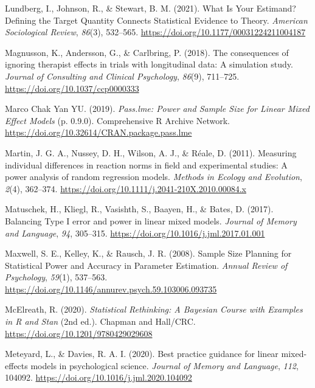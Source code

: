 \documentclass[
  man,
  floatsintext,
  longtable,
  a4paper,
  nolmodern,
  notxfonts,
  notimes,
  colorlinks=true,linkcolor=blue,citecolor=blue,urlcolor=blue]{apa7}
\newlength{\cslhangindent}
\newenvironment{CSLReferences}[2] %
 {\begin{list}{}{%
  \setlength{\itemindent}{0pt}
  \setlength{\leftmargin}{0pt}
  \setlength{\parsep}{0pt}
  \ifodd #1
   \setlength{\leftmargin}{\cslhangindent}
   \setlength{\itemindent}{-1\cslhangindent}
  \fi
  \setlength{\itemsep}{#2\baselineskip}}}
 {\end{list}}
\begin{document}
\begin{CSLReferences}{1}{0}
Lundberg, I., Johnson, R., \& Stewart, B. M. (2021). What {Is Your
Estimand}? {Defining} the {Target Quantity Connects Statistical
Evidence} to {Theory}. \emph{American Sociological Review},
\emph{86}(3), 532--565. \url{https://doi.org/10.1177/00031224211004187}

Magnusson, K., Andersson, G., \& Carlbring, P. (2018). The consequences
of ignoring therapist effects in trials with longitudinal data: {A}
simulation study. \emph{Journal of Consulting and Clinical Psychology},
\emph{86}(9), 711--725. \url{https://doi.org/10.1037/ccp0000333}

Marco Chak Yan YU. (2019). \emph{Pass.lme: {Power} and {Sample Size} for
{Linear Mixed Effect Models}} (p. 0.9.0). Comprehensive R Archive
Network. \url{https://doi.org/10.32614/CRAN.package.pass.lme}

Martin, J. G. A., Nussey, D. H., Wilson, A. J., \& Réale, D. (2011).
Measuring individual differences in reaction norms in field and
experimental studies: A power analysis of random regression models.
\emph{Methods in Ecology and Evolution}, \emph{2}(4), 362--374.
\url{https://doi.org/10.1111/j.2041-210X.2010.00084.x}

Matuschek, H., Kliegl, R., Vasishth, S., Baayen, H., \& Bates, D.
(2017). Balancing {Type I} error and power in linear mixed models.
\emph{Journal of Memory and Language}, \emph{94}, 305--315.
\url{https://doi.org/10.1016/j.jml.2017.01.001}

Maxwell, S. E., Kelley, K., \& Rausch, J. R. (2008). Sample {Size
Planning} for {Statistical Power} and {Accuracy} in {Parameter
Estimation}. \emph{Annual Review of Psychology}, \emph{59}(1), 537--563.
\url{https://doi.org/10.1146/annurev.psych.59.103006.093735}

McElreath, R. (2020). \emph{Statistical {Rethinking}: {A Bayesian
Course} with {Examples} in {R} and {Stan}} (2nd ed.). {Chapman and
Hall/CRC}. \url{https://doi.org/10.1201/9780429029608}

Meteyard, L., \& Davies, R. A. I. (2020). Best practice guidance for
linear mixed-effects models in psychological science. \emph{Journal of
Memory and Language}, \emph{112}, 104092.
\url{https://doi.org/10.1016/j.jml.2020.104092}


\end{CSLReferences}
\end{document}
